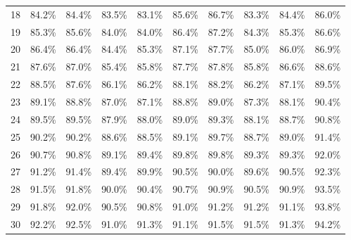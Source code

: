 \begin{table}[h]
\begin{center}
\begin{tabular}{c|p{1.2cm}p{1.1cm}p{1.1cm}p{1.7cm}p{1.5cm}p{1.2cm}p{1.2cm}p{1.2cm}p{1.2cm}}
	18 & 84.2\% & 84.4\% & 83.5\% & 83.1\% & 85.6\% & 86.7\% & 83.3\% & 84.4\% & 86.0\% \\ 
	19 & 85.3\% & 85.6\% & 84.0\% & 84.0\% & 86.4\% & 87.2\% & 84.3\% & 85.3\% & 86.6\% \\ 
	20 & 86.4\% & 86.4\% & 84.4\% & 85.3\% & 87.1\% & 87.7\% & 85.0\% & 86.0\% & 86.9\% \\ 
	21 & 87.6\% & 87.0\% & 85.4\% & 85.8\% & 87.7\% & 87.8\% & 85.8\% & 86.6\% & 88.6\% \\ 
	22 & 88.5\% & 87.6\% & 86.1\% & 86.2\% & 88.1\% & 88.2\% & 86.2\% & 87.1\% & 89.5\% \\ 
	23 & 89.1\% & 88.8\% & 87.0\% & 87.1\% & 88.8\% & 89.0\% & 87.3\% & 88.1\% & 90.4\% \\ 
	24 & 89.5\% & 89.5\% & 87.9\% & 88.0\% & 89.0\% & 89.3\% & 88.1\% & 88.7\% & 90.8\% \\ 
	25 & 90.2\% & 90.2\% & 88.6\% & 88.5\% & 89.1\% & 89.7\% & 88.7\% & 89.0\% & 91.4\% \\ 
	26 & 90.7\% & 90.8\% & 89.1\% & 89.4\% & 89.8\% & 89.8\% & 89.3\% & 89.3\% & 92.0\% \\ 
	27 & 91.2\% & 91.4\% & 89.4\% & 89.9\% & 90.5\% & 90.0\% & 89.6\% & 90.5\% & 92.3\% \\ 
	28 & 91.5\% & 91.8\% & 90.0\% & 90.4\% & 90.7\% & 90.9\% & 90.5\% & 90.9\% & 93.5\% \\ 
	29 & 91.8\% & 92.0\% & 90.5\% & 90.8\% & 91.0\% & 91.2\% & 91.2\% & 91.1\% & 93.8\% \\ 
	30 & 92.2\% & 92.5\% & 91.0\% & 91.3\% & 91.1\% & 91.5\% & 91.5\% & 91.3\% & 94.2\% \\
	\hline\hline
    \end{tabular}
    \label{tab:media_fisher}
    \end{center}
\end{table}	